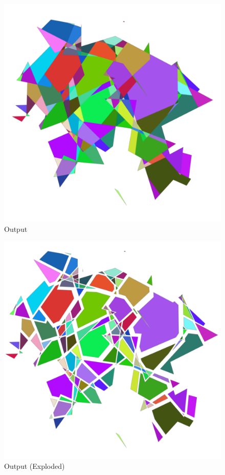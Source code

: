 \begin{figure}[p!]
    \includegraphics[width=\textwidth]{./img/test-lines-out-compact.pdf}%
    \caption{Output}
\end{figure}

\begin{figure}[p!]
    \includegraphics[width=\textwidth]{./img/test-lines-out.pdf}%
    \caption{Output (Exploded)}
\end{figure}